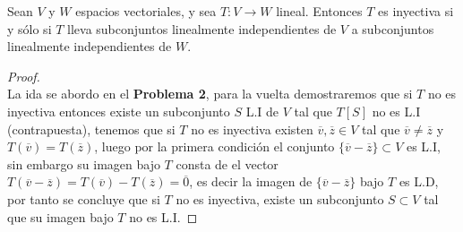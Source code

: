\documentclass[11pt]{article}
\numberwithin{equation}{section}
\begin{document}
\begin{Problema}{} Sean $V$ y $W$ espacios vectoriales, y sea $T: V \to W$ lineal. 
    Entonces $T$ es inyectiva si y sólo si $T$ lleva subconjuntos linealmente 
    independientes de $V$ a subconjuntos linealmente independientes de $W$.
\end{Problema}      
\begin{proof}\,\\
    La ida se abordo en el \textbf{Problema 2}, para la vuelta demostraremos que si $T$ no es inyectiva
    entonces existe un subconjunto $S$ L.I de $V$ tal que $T[S]$ no es L.I (contrapuesta), tenemos que si $T$ no es inyectiva
    existen $\overline{v},\overline{z}\in V$ tal que $\overline{v}\neq \overline{z}$ y $T(\overline{v})=T(\overline{z})$, luego
    por la primera condici\'on el conjunto $\{\overline{v}-\overline{z}\}\subset V$ es L.I, sin embargo  su imagen bajo $T$ consta 
    de el vector $T(\overline{v}-\overline{z})=T(\overline{v})-T(\overline{z})=\overline{0}$, es decir la imagen de $\{\overline{v}-\overline{z}\}$
    bajo $T$ es L.D, por tanto se concluye que si $T$ no es inyectiva, existe un subconjunto $S\subset V$ tal que su imagen bajo $T$
    no es L.I.
\end{proof}\,\\
\end{document}
